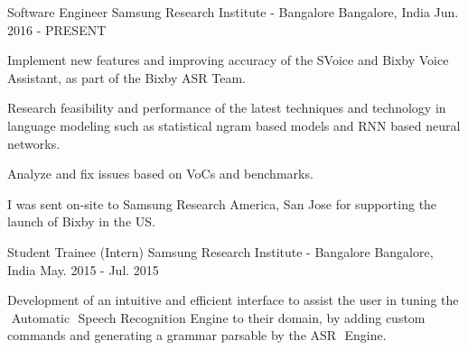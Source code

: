 

\begin{cventries}

  \cventry
    {Software Engineer} %
    {Samsung Research Institute - Bangalore} %
    {Bangalore, India} %
    {Jun. 2016 - PRESENT} %
    {
      \begin{cvitems}
      \item{Implement new features and improving accuracy of the SVoice and Bixby Voice Assistant, as part of the Bixby ASR Team.}
      \item{Research feasibility and performance of the latest techniques and technology in language modeling such as statistical ngram based models and RNN based neural networks.}
      \item{Analyze and fix issues based on VoCs and benchmarks. }
      \item{I was sent on-site to Samsung Research America, San Jose for supporting the launch of Bixby in the US.}
      \end{cvitems}
    }

  \cventry
    {Student Trainee (Intern)} %
    {Samsung Research Institute - Bangalore} %
    {Bangalore, India} %
    {May. 2015 - Jul. 2015} %
    {
      \begin{cvitems}
      \item{Development of an intuitive and efficient interface to assist the user in tuning the ​ Automatic ​ Speech R​ecognition Engine to their domain, by adding custom commands and generating a grammar parsable by the ASR​ ​ Engine.}
      \end{cvitems}
    }


\end{cventries}

